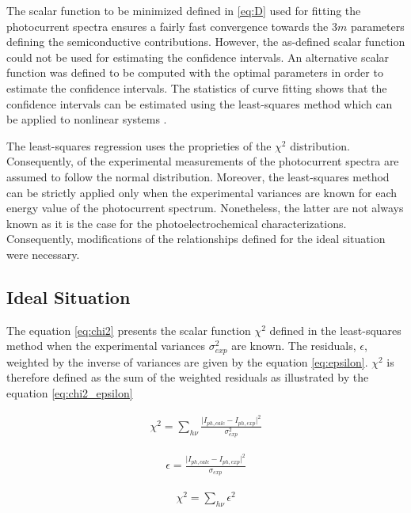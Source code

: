 \documentclass[10pt, 3p, sort&compress]{elsarticle}
\newcommand{\modi}[1]{\vert #1 \vert}
\newcommand{\sigmae}{\sigma _{exp}}
\newcommand{\iphe}{I_{ph,exp}}
\newcommand{\iphc}{I_{ph,calc}}
\newcommand{\hv}{h  \nu}
\newcommand{\eps}{\epsilon}
\begin{document}
The scalar function to be minimized defined in \ref{eq:D} used for fitting the photocurrent spectra ensures a fairly fast convergence towards the $3m$ parameters defining the semiconductive contributions. However, the as-defined scalar function could not be used for estimating the confidence intervals. An alternative scalar function was defined to be computed with the optimal parameters in order to estimate the confidence intervals. The statistics of curve fitting shows that the confidence intervals can be estimated using the least-squares method which can be applied to nonlinear systems \citep{bevington2003,nocedal2006}.

The least-squares regression uses the proprieties of the $\chi ^2$ distribution. Consequently, of the experimental measurements of the photocurrent spectra are assumed to follow the normal distribution. Moreover, the least-squares method can be strictly applied only when the experimental variances are known for each energy value of the photocurrent spectrum. Nonetheless, the latter are not always known as it is the case for the photoelectrochemical characterizations. Consequently, modifications of the relationships defined for the ideal situation were necessary.

\subsection{Ideal Situation}
The equation \ref{eq:chi2} presents the scalar function $\chi ^2$ defined in the least-squares method when the experimental variances $\sigmae ^2$ are known. The residuals, $\epsilon$, weighted by the inverse of variances are given by the equation \ref{eq:epsilon}. $\chi ^2$ is therefore defined as the sum of the weighted residuals as illustrated by the equation \ref{eq:chi2_epsilon}

\begin{equation}
\begin{split}
\chi ^2 = \sum _{\hv} \frac{\modi{\iphc-\iphe}^2}{\sigmae^2}
\end{split}
\label{eq:chi2}
\end{equation}

\begin{equation}
\begin{split}
\epsilon = \frac{\modi{\iphc-\iphe}^2}{\sigmae}
\end{split}
\label{eq:epsilon}
\end{equation}

\begin{equation}
\begin{split}
\chi ^2 = \sum _{\hv} \eps ^2
\end{split}
\label{eq:chi2_epsilon}
\end{equation}
\end{document}
